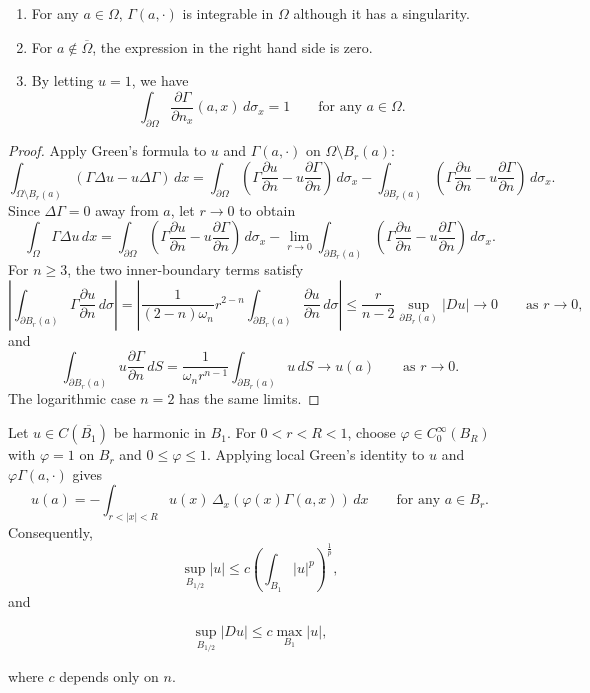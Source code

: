 \begin{remark}\label{hanlin:remark-green-identity}
\leavevmode
\begin{enumerate}
\item[(i)] For any $a \in \Omega$, $\Gamma(a,\cdot)$ is integrable in $\Omega$ although it has a singularity.
\item[(ii)] For $a \notin \overline{\Omega}$, the expression in the right hand side is zero.
\item[(iii)] By letting $u=1$, we have
\[
\int_{\partial \Omega}\frac{\partial \Gamma}{\partial n_x}(a,x)\,d\sigma_x = 1
\qquad \text{for any $a \in \Omega$.}
\]
\end{enumerate}
\end{remark}

\begin{proof}
\sketch Apply Green's formula to $u$ and $\Gamma(a,\cdot)$ on
$\Omega\setminus B_r(a)$:
\[
\int_{\Omega \setminus B_r(a)} (\Gamma \Delta u - u\Delta \Gamma)\,dx
= \int_{\partial\Omega}
\left(\Gamma\frac{\partial u}{\partial n} - u\frac{\partial \Gamma}{\partial n}\right)\,d\sigma_x
- \int_{\partial B_r(a)}
\left(\Gamma\frac{\partial u}{\partial n} - u\frac{\partial \Gamma}{\partial n}\right)\,d\sigma_x.
\]
Since $\Delta\Gamma=0$ away from $a$, let $r\to0$ to obtain
\[
\int_{\Omega}\Gamma \Delta u\,dx
= \int_{\partial\Omega}\left(\Gamma\frac{\partial u}{\partial n} - u\frac{\partial \Gamma}{\partial n}\right)\,d\sigma_x
- \lim_{r\to 0}\int_{\partial B_r(a)}
\left(\Gamma\frac{\partial u}{\partial n} - u\frac{\partial \Gamma}{\partial n}\right)\,d\sigma_x.
\]
For $n\ge3$, the two inner-boundary terms satisfy
\[
\left|\int_{\partial B_r(a)} \Gamma \frac{\partial u}{\partial n}\,d\sigma\right|
= \left|\frac{1}{(2-n)\omega_n}r^{2-n}\int_{\partial B_r(a)}\frac{\partial u}{\partial n}\,d\sigma\right|
\leq \frac{r}{n-2}\sup_{\partial B_r(a)}|Du| \to 0 \qquad \text{as } r\to 0,
\]
and
\[
\int_{\partial B_r(a)}u\frac{\partial \Gamma}{\partial n}\,dS
= \frac{1}{\omega_n r^{n-1}}\int_{\partial B_r(a)}u\,dS \to u(a) \qquad \text{as } r\to 0.
\]
The logarithmic case $n=2$ has the same limits.
\end{proof}

\begin{remark}\label{hanlin:remark-local-green-gradient}
Let $u\in C(\overline{B_1})$ be harmonic in $B_1$. For $0<r<R<1$, choose
$\varphi\in C_0^\infty(B_R)$ with $\varphi=1$ on $B_r$ and
$0\le\varphi\le1$. Applying local Green's identity to $u$ and
$\varphi\Gamma(a,\cdot)$ gives
\[
u(a) = - \int_{r<|x|<R} u(x)\,\Delta_x(\varphi(x)\Gamma(a,x))\,dx
\qquad \text{for any } a \in B_r.
\]
Consequently,
\[
\sup_{B_{1/2}} |u|
\leq c\left(\int_{B_1}|u|^p\right)^{\frac{1}{p}},
\]
and

\[
\sup_{B_{1/2}} |Du| \leq c \max_{B_1} |u|,
\]

where $c$ depends only on $n$.
\end{remark}

